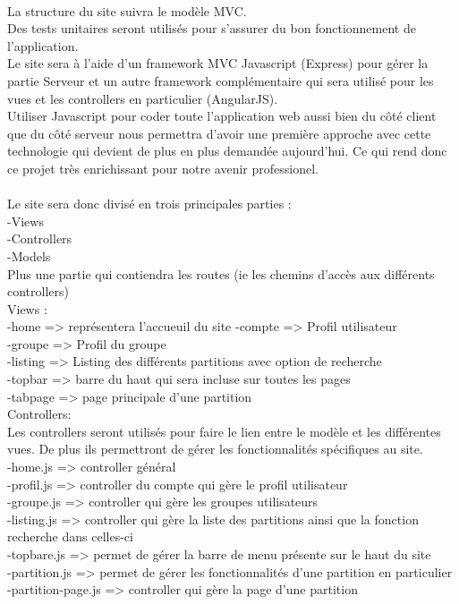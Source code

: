 \paragraph{}
La structure du site suivra le modèle MVC.\\
Des tests unitaires seront utilisés pour s'assurer du bon fonctionnement de l'application.\\
Le site sera à l'aide d'un framework MVC Javascript (Express) pour gérer la partie Serveur et un autre framework complémentaire qui sera utilisé pour les vues et les controllers en particulier (AngularJS).\\
Utiliser Javascript pour coder toute l'application web aussi bien du côté client que du côté serveur nous permettra d'avoir une première approche avec cette technologie qui devient de plus en plus demandée aujourd'hui. Ce qui rend donc ce projet très enrichissant pour notre avenir professionel.
\\
\\
Le site sera donc divisé en trois principales parties : \\
-Views \\
-Controllers \\ 
-Models \\
Plus une partie qui contiendra les routes (ie les chemins d'accès aux différents controllers)
\\

Views : \\ 
-home => représentera l'accueuil du site
-compte => Profil utilisateur \\
-groupe => Profil du groupe \\
-listing => Listing des différents partitions avec option de recherche\\
-topbar => barre du haut qui sera incluse sur toutes les pages\\
-tabpage => page principale d'une partition\\

Controllers: \\
Les controllers seront utilisés pour faire le lien entre le modèle et les différentes vues. De plus ils permettront de gérer les fonctionnalités spécifiques au site. \\
-home.js => controller général \\
-profil.js => controller du compte qui gère le profil utilisateur\\
-groupe.js => controller qui gère les groupes utilisateurs \\
-listing.js => controller qui gère la liste des partitions ainsi que la fonction recherche dans celles-ci\\
-topbare.js => permet de gérer la barre de menu présente sur le haut du site\\
-partition.js  => permet de gérer les fonctionnalités d'une partition en particulier\\
-partition-page.js => controller qui gère la page d'une partition\\


